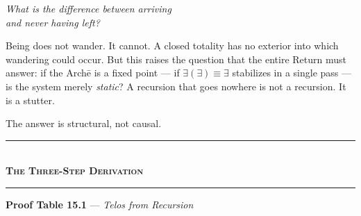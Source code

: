\documentclass[10pt, openany, oneside]{book}
\renewcommand{\normalsize}{\fontsize{10}{13}\selectfont}
\begin{document}
\vspace{1.5em}

\begin{center}
    \itshape
    What is the difference between arriving\\
    and never having left?
\end{center}

\vspace{2em}


\noindent Being does not wander. It cannot. A closed totality has no exterior into which wandering could occur. But this raises the question that the entire Return must answer: if the Arch\={e} is a fixed point --- if $\exists(\exists) \equiv \exists$ stabilizes in a single pass --- is the system merely \textit{static}? A recursion that goes nowhere is not a recursion. It is a stutter.

The answer is structural, not causal.

\vspace{1.5em}


\begin{center}
    \rule{0.3\textwidth}{0.4pt}\\[0.5em]
    {\normalsize\bfseries\scshape The Three-Step Derivation}\\[0.3em]
    \rule{0.3\textwidth}{0.4pt}
\end{center}

\vspace{1em}

\textbf{Proof Table 15.1} --- \textit{Telos from Recursion}

\vspace{0.5em}
\end{document}
